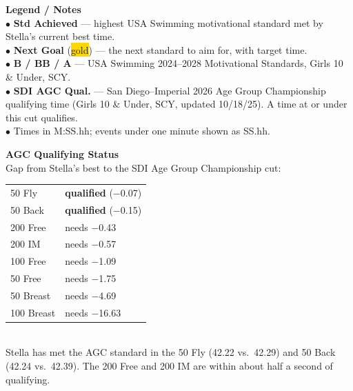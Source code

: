 \documentclass[11pt,landscape]{article}
\begin{document}
\vspace{7pt}
\noindent\begin{minipage}{0.60\textwidth}
{\footnotesize
\textbf{Legend / Notes}\\
$\bullet$ \textbf{Std Achieved} --- highest USA Swimming motivational standard met by Stella's current best time.\\
$\bullet$ \textbf{Next Goal} (\colorbox{gold}{gold}) --- the next standard to aim for, with target time.\\
$\bullet$ \textbf{B / BB / A} --- USA Swimming 2024--2028 Motivational Standards, Girls 10 \& Under, SCY.\\
$\bullet$ \textbf{SDI AGC Qual.} --- San Diego--Imperial 2026 Age Group Championship qualifying time (Girls 10 \& Under, SCY, updated 10/18/25). A time at or under this cut qualifies.\\
$\bullet$ Times in M:SS.hh; events under one minute shown as SS.hh.}
\end{minipage}\hfill
\begin{minipage}{0.37\textwidth}
{\footnotesize
\textbf{AGC Qualifying Status}\\
Gap from Stella's best to the SDI Age Group Championship cut:\\[3pt]
\begin{tabular}{ll}
50 Fly     & \cellcolor{qualgreen}\textbf{qualified} ($-$0.07) \\
50 Back    & \cellcolor{qualgreen}\textbf{qualified} ($-$0.15) \\
200 Free   & needs $-$0.43 \\
200 IM     & needs $-$0.57 \\
100 Free   & needs $-$1.09 \\
50 Free    & needs $-$1.75 \\
50 Breast  & needs $-$4.69 \\
100 Breast & needs $-$16.63 \\
\end{tabular}\\[3pt]
{\scriptsize Stella has met the AGC standard in the 50 Fly (42.22 vs.\ 42.29) and 50 Back (42.24 vs.\ 42.39). The 200 Free and 200 IM are within about half a second of qualifying.}}
\end{minipage}
\end{document}
